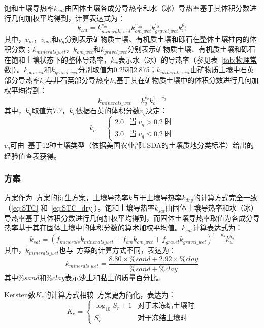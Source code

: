 饱和土壤导热率$k_{sat}$由固体土壤各成分导热率和水（冰）导热率基于其体积分数进行几何加权平均得到，计算表达式为：
\begin{equation}\label{eq:STC_wet}
k_{sat}=k_{minerals\_wet}^{v_m}k_{om\_wet}^{v_{om}}k_{gravel\_wet}^{v_g}k_w^{\theta_s}
\end{equation}
其中，$v_m$，$v_{om}$和$v_g$分别表示矿物质土壤、有机质土壤和砾石在整体土壤柱内的体积分数；$k_{minerals\_wet}$，$k_{om\_wet}$和$k_{gravel\_wet}$分别表示矿物质土壤、有机质土壤和砾石在饱和土壤状态下的整体导热率，$k_w$表示水（冰）的导热率（参见表~\ref{tab:物理常数}）。$k_{om\_wet}$和$k_{gravel\_wet}$分别取值为0.25和2.875；$k_{minerals\_wet}$由矿物质土壤中石英部分导热率$k_q$与非石英部分导热率$k_o$基于其在矿物质土壤中的体积分数进行几何加权平均得到：$$k_{minerals\_wet}=k_q^{v_q}k_o^{1-v_q}$$
其中，$k_q$取值为7.7，$k_o$依据石英的体积分数$v_q$决定：
\begin{equation}
k_o=\begin{cases}
2.0 & \text {当}\ v_q>0.2\ \text {时} \\ 
3.0 & \text {当}\ v_q\leqslant 0.2\ \text {时}
\end{cases}
\end{equation}
$v_q$可由~\citet{PL_98}基于12种土壤类型（依据美国农业部USDA的土壤质地分类标准）给出的经验值查表获得。

\subsubsection{\citet{farouki1981thermal}方案}
\citet{farouki1981thermal}方案作为~\citet{Johansen1975}方案的衍生方案，土壤导热率$k$与干土壤导热率$k_{dry}$的计算方式完全一致（\eqref{eq:STC} 和~\eqref{eq:STC_dry}）。饱和土壤导热率$k_{sat}$由固体土壤导热率和水（冰）导热率基于其体积分数进行几何加权平均得到，而固体土壤导热率取值为各成分导热率基于其在固体土壤中的体积分数的算术加权平均值。$k_{sat}$计算表达式为：
\begin{equation}\label{eq:STC_wet_Farouki}
k_{sat}=(f_{minerals}k_{minerals\_wet}+f_{om}k_{om\_wet}+f_{gravel}k_{gravel\_wet})^{1-\theta_s}k_w^{\theta_s}
\end{equation}
其中，$k_{minerals\_wet}$也与~\citet{Johansen1975}方案的计算方式不同，表达为：$$k_{minerals\_wet}=\frac{8.80\times\%sand+2.92\times\%clay}{\%sand+\%clay}$$ 
其中$\%sand$和$\%clay$表示沙土和黏土的质量百分比。

Kersten数$K_e$的计算方式相较~\citet{Johansen1975}方案更为简化，表达为：
\begin{equation}
K_e=\begin{cases}
\log_{10}S_r+1 & \text {对于未冻结土壤时} \\ 
S_r & \text {对于冻结土壤时}
\end{cases}
\end{equation}

